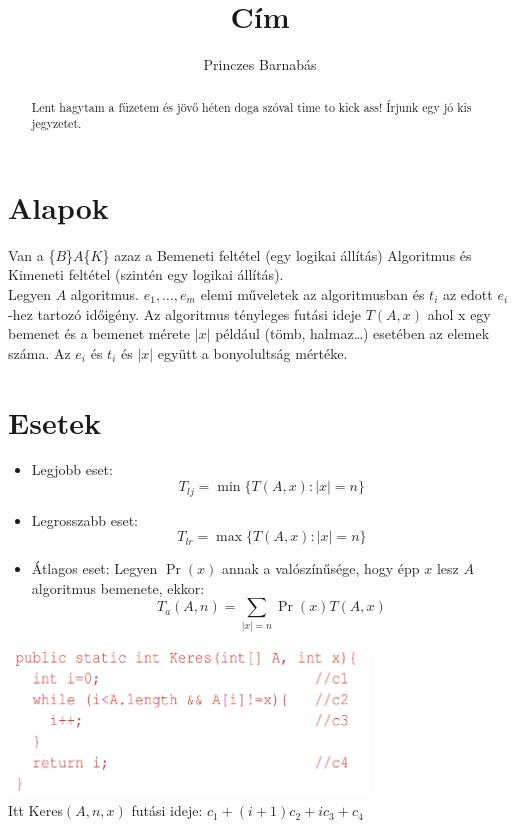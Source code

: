 \documentclass{article}
\title{Cím}
\author{Princzes
Barnabás}
\theoremstyle{mytheoremstyle}
\theoremstyle{mytheoremstyle}
\theoremstyle{myproblemstyle}
\begin{document}
\maketitle
\begin{abstract}
	Lent hagytam a füzetem és jövő héten doga szóval time to kick ass!
	Írjunk egy jó kis jegyzetet.
\end{abstract}
\section{Alapok}
Van a \{$B$\}$A$\{$K$\} azaz a Bemeneti
feltétel (egy logikai állítás) Algoritmus és Kimeneti feltétel
(szintén egy logikai állítás).
\\
Legyen $A$ algoritmus. $e_1,\ldots,e_m$ elemi műveletek az algoritmusban
és $t_i$ az edott $e_i$-hez tartozó időigény. Az algoritmus tényleges futási ideje
$T(A,x)$ ahol x egy bemenet és a bemenet mérete $|x|$ például
(tömb, halmaz\ldots) esetében az elemek száma.
Az $e_i$ és $t_i$ és $|x|$ együtt a bonyolultság mértéke.

\section{Esetek}
\begin{itemize}
	\item Legjobb eset: \[T_{lj} = \min \{T(A,x):|x|=n\}\]
	\item Legrosszabb eset: \[T_{lr} = \max\{T(A,x):|x|=n\}\]
	\item Átlagos eset: Legyen $\Pr(x)$ annak
	      a valószínűsége, hogy épp $x$ lesz
	      $A$ algoritmus bemenete, ekkor:
	      \\ \[T_a(A,n) = \sum_{|x|=n}\Pr(x)T(A,x)\]
\end{itemize}
\begin{center}
	\includegraphics[height=4cm]{keres}
	\\
	Itt Keres$(A,n,x)$ futási ideje: $c_1+(i+1)c_2+ic_3+c_4$
\end{center}
\end{document}
